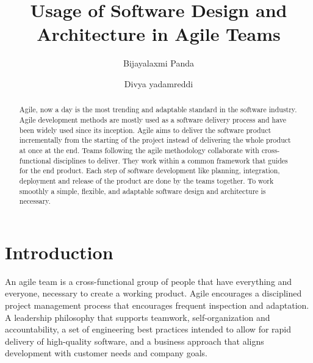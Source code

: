 \documentclass[sigplan,screen]{acmart}
\begin{document}
%
\title{Usage of Software Design and Architecture in Agile Teams}

%
\author{Bijayalaxmi Panda}

\author{Divya yadamreddi}

%
\begin{abstract}
Agile, now a day is the most trending and adaptable standard in the software industry. Agile development methods are mostly used as a software delivery process and have been widely used since its inception. Agile aims to deliver the software product incrementally from the starting of the project instead of delivering the whole product at once at the end. Teams following the agile methodology collaborate with cross-functional disciplines to deliver. They work within a common framework that guides for the end product. Each step of software development like planning, integration, deployment and release of the product are done by the teams together. To work smoothly a simple, flexible, and adaptable software design and architecture is necessary.
\end{abstract}

%

%
\maketitle

\section{Introduction}
An agile team is a cross-functional group of people that have everything and everyone, necessary to create a working product. Agile encourages a disciplined project management process that encourages frequent inspection and adaptation. A leadership philosophy that supports teamwork, self-organization and accountability, a set of engineering best practices intended to allow for rapid delivery of high-quality software, and a business approach that aligns development with customer needs and company goals.\cite{Agile01}
\end{document}
